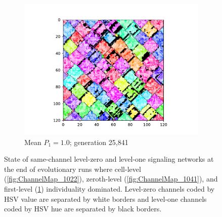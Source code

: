 \begin{figure}[!htbp]
\begin{center}
\begin{subfigure}[b]{0.82\columnwidth}
  \includegraphics[width=\columnwidth,trim={2.5cm 0.5cm 2.5cm 1cm},clip]{img/ChannelMap_1008_update19500000}
  \caption{Mean $P_1 = 1.0$; generation 25,841}
  \label{fig:ChannelMap_1008}
\end{subfigure}

\caption{
State of same-channel level-zero and level-one signaling networks at the end of evolutionary runs where cell-level (\ref{fig:ChannelMap_1022}), zeroth-level (\ref{fig:ChannelMap_1041}), and first-level (\ref{fig:ChannelMap_1008}) individuality dominated.
Level-zero channels coded by HSV value are separated by white borders and level-one channels coded by HSV hue are separated by black borders.
}
\label{fig:outcome_grids}
\end{center}
\end{figure}
